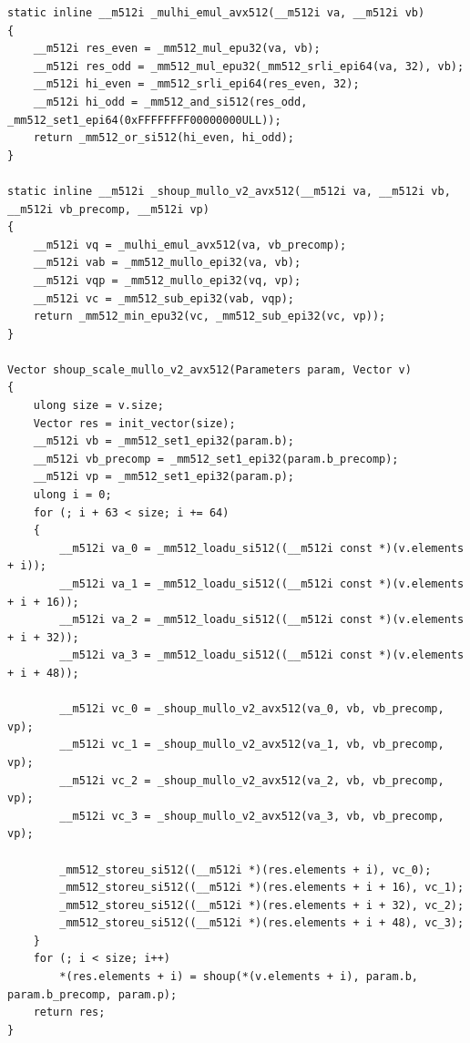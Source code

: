 \documentclass{article}
\begin{document}
\begin{lstlisting}[caption = Variant 3 (AVX-512)]
static inline __m512i _mulhi_emul_avx512(__m512i va, __m512i vb)
{
    __m512i res_even = _mm512_mul_epu32(va, vb);
    __m512i res_odd = _mm512_mul_epu32(_mm512_srli_epi64(va, 32), vb);
    __m512i hi_even = _mm512_srli_epi64(res_even, 32);
    __m512i hi_odd = _mm512_and_si512(res_odd, _mm512_set1_epi64(0xFFFFFFFF00000000ULL));
    return _mm512_or_si512(hi_even, hi_odd);
}

static inline __m512i _shoup_mullo_v2_avx512(__m512i va, __m512i vb, __m512i vb_precomp, __m512i vp)
{
    __m512i vq = _mulhi_emul_avx512(va, vb_precomp);
    __m512i vab = _mm512_mullo_epi32(va, vb);
    __m512i vqp = _mm512_mullo_epi32(vq, vp);
    __m512i vc = _mm512_sub_epi32(vab, vqp);
    return _mm512_min_epu32(vc, _mm512_sub_epi32(vc, vp));
}

Vector shoup_scale_mullo_v2_avx512(Parameters param, Vector v)
{
    ulong size = v.size;
    Vector res = init_vector(size);
    __m512i vb = _mm512_set1_epi32(param.b);
    __m512i vb_precomp = _mm512_set1_epi32(param.b_precomp);
    __m512i vp = _mm512_set1_epi32(param.p);
    ulong i = 0;
    for (; i + 63 < size; i += 64)
    {
        __m512i va_0 = _mm512_loadu_si512((__m512i const *)(v.elements + i));
        __m512i va_1 = _mm512_loadu_si512((__m512i const *)(v.elements + i + 16));
        __m512i va_2 = _mm512_loadu_si512((__m512i const *)(v.elements + i + 32));
        __m512i va_3 = _mm512_loadu_si512((__m512i const *)(v.elements + i + 48));

        __m512i vc_0 = _shoup_mullo_v2_avx512(va_0, vb, vb_precomp, vp);
        __m512i vc_1 = _shoup_mullo_v2_avx512(va_1, vb, vb_precomp, vp);
        __m512i vc_2 = _shoup_mullo_v2_avx512(va_2, vb, vb_precomp, vp);
        __m512i vc_3 = _shoup_mullo_v2_avx512(va_3, vb, vb_precomp, vp);

        _mm512_storeu_si512((__m512i *)(res.elements + i), vc_0);
        _mm512_storeu_si512((__m512i *)(res.elements + i + 16), vc_1);
        _mm512_storeu_si512((__m512i *)(res.elements + i + 32), vc_2);
        _mm512_storeu_si512((__m512i *)(res.elements + i + 48), vc_3);
    }
    for (; i < size; i++)
        *(res.elements + i) = shoup(*(v.elements + i), param.b, param.b_precomp, param.p);
    return res;
} 
\end{lstlisting}


\newpage
\end{document}
